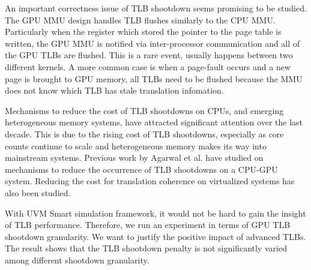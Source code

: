 An important correctness issue of TLB shootdown seems promising to be studied. The GPU MMU design handles TLB flushes similarly to the CPU MMU. Particularly when the register which stored the pointer to the page table is written, the GPU MMU is notified via inter-processor communication and all of the GPU TLBs are flushed. This is a rare event, usually happens between two different kernels. A more common case is when a page-fault occurs and a new page is brought to GPU memory, all TLBs need to be flushed because the MMU does not know which TLB has stale translation infomation.

Mechanisms to reduce the cost of TLB shootdowns on CPUs, and emerging heterogeneous memory systems, have attracted significant attention over the last decade. This is due to the rising cost of TLB shootdowns, especially as core counts continue to scale and heterogeneous memory makes its way into mainstream systems. Previous work by Agarwal et al. have studied on mechanisms to reduce the occurrence of TLB shootdowns on a CPU-GPU system. Reducing the cost for translation coherence on virtualized systems has also been studied.

With UVM Smart simulation framework, it would not be hard to gain the insight of TLB performance. Therefore, we run an experiment in terms of GPU TLB shootdown granularity. We want to justify the positive impact of advanced TLBs. The result shows that the TLB shootdown penalty is not significantly varied among different shootdown granularity.

